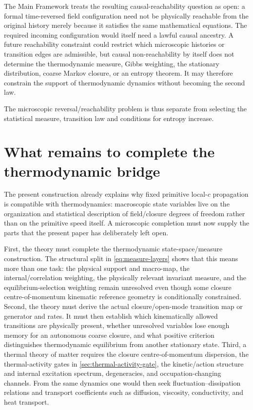 \documentclass[11pt]{article}
\theoremstyle{definition}
\begin{document}
The Main Framework treats the resulting causal-reachability question as open: a formal
time-reversed field configuration need not be physically reachable from the original
history merely because it satisfies the same mathematical equations.  The required
incoming configuration would itself need a lawful causal ancestry.  A future reachability
constraint could restrict which microscopic histories or transition edges are admissible,
but causal non-reachability by itself does not determine the thermodynamic measure, Gibbs
weighting, the stationary distribution, coarse Markov closure, or an entropy theorem.  It may
therefore constrain the support of thermodynamic dynamics without becoming the second law.

The microscopic reversal/reachability problem is thus separate from selecting
the statistical measure, transition law and conditions for entropy increase.

\section{What remains to complete the thermodynamic bridge}
\label{sec:open}
The present construction already explains why fixed primitive local-$c$ propagation is
compatible with thermodynamics: macroscopic state variables live on the organization and
statistical description of field/closure degrees of freedom rather than on the primitive
speed itself.  A microscopic completion must now supply the parts that the present paper
has deliberately left open.

First, the theory must complete the thermodynamic state-space/measure construction.  The
structural split in \cref{eq:measure-layers} shows that this means more than one task:
the physical support and macro-map, the internal/correlation weighting, the physically
relevant invariant measure, and the equilibrium-selection weighting remain unresolved even
though some closure centre-of-momentum kinematic reference geometry is conditionally constrained.  Second,
the theory must derive the actual closure/open-mode transition map or generator and rates.
It must then establish which kinematically allowed transitions are physically present, whether
unresolved variables lose enough memory for an autonomous coarse closure, and what positive
criterion distinguishes thermodynamic equilibrium from another stationary state.  Third, a
thermal theory of matter requires the closure centre-of-momentum dispersion, the
thermal-activity gates in \cref{sec:thermal-activity-gate}, the kinetic/action
structure and internal excitation spectrum, degeneracies, and occupation-changing
channels.  From the same dynamics
one would then seek fluctuation--dissipation relations and transport coefficients such as
diffusion, viscosity, conductivity, and heat transport.
\end{document}
